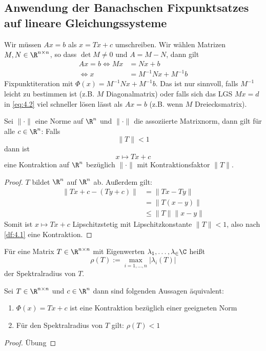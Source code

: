 \documentclass{mycourse}
\begin{document}
\subsection*{Anwendung der Banachschen Fixpunktsatzes auf lineare Gleichungssysteme}

Wir müssen $Ax=b$ als $x=Tx+c$ umschreiben.
Wir wählen Matrizen $M,N\in \R^{n\times n}$, so dass $\det M\neq 0$ und $A=M-N$, dann gilt
\begin{align}
	\label{eq:4.2}
	Ax=b \iff Mx &= Nx +b\\
	\iff x &= M^{-1}Nx + M^{-1}b
\end{align}
Fixpunktiteration mit $\Phi(x) = M^{-1}Nx + M^{-1}b$.
Das ist nur sinnvoll, falls $M^{-1}$ leicht zu bestimmen ist (z.B. $M$ Diagonalmatrix) oder falls sich das LGS $Mx=d$ in \ref{eq:4.2} viel schneller lösen lässt als $Ax=b$ (z.B. wenn $M$ Dreiecksmatrix).

\begin{lem}
	\label{lem:4.3}
	Sei $\|\cdot\|$ eine Norme auf $\R^n$ und $\|\cdot\|$ die assoziierte Matrixnorm, dann gilt für alle $c\in \R^n$:
	Falls
	\[
		\|T\| < 1
	\]
	dann ist
	\[
		x\mapsto Tx +c
	\]
	eine Kontraktion auf $\R^n$ bezüglich $\|\cdot\|$ mit Kontraktionsfaktor $\|T\|$.
	\begin{proof}
		$T$ bildet $\R^n$ auf $\R^n$ ab.
		Außerdem gilt:
		\begin{align*}
			\|Tx+c - (Ty+c)\| &= \| Tx -Ty\| \\
							  &= \|T(x-y)\| \\
				  &\le \|T\|\|x-y\|
		\end{align*}
		Somit ist $x\mapsto Tx+c$ Lipschitzstetig mit Lipschitzkonstante $\|T\|<1$, also nach \ref{df:4.1} eine Kontraktion.
	\end{proof}
\end{lem}

\begin{df}
	\label{df:4.5}
	Für eine Matrix $T\in \R^{n\times n}$ mit Eigenwerten $\lambda_1, \dotsc, \lambda_ \in \C$
	heißt 
	\[
		\rho(T) := \max_{i=1,\dotsc,n}|\lambda_i(T)|
	\]
	der Spektralradius von $T$.
\end{df}

\begin{lem}
	\label{lem:4.4}
	Sei $T\in \R^{n\times n}$ und $c\in \R^n$ dann sind folgenden Aussagen äquivalent:
	\begin{enumerate}
		\item $\Phi(x) = Tx+c$ ist eine Kontraktion bezüglich einer geeigneten Norm
		\item Für den Spektralradius von $T$ gilt: $\rho(T) < 1$
	\end{enumerate}
	\begin{proof}
		Übung
	\end{proof}
\end{lem}
\end{document}
